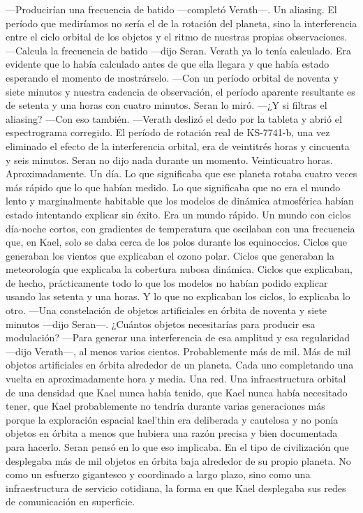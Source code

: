 \documentclass[11pt,a5paper,twoside]{book}
\begin{document}
—Producirían una frecuencia de batido —completó Verath—. Un aliasing. El período que mediríamos no sería el de la rotación del planeta, sino la interferencia entre el ciclo orbital de los objetos y el ritmo de nuestras propias observaciones.
—Calcula la frecuencia de batido —dijo Seran.
Verath ya lo tenía calculado. Era evidente que lo había calculado antes de que ella llegara y que había estado esperando el momento de mostrárselo.
—Con un período orbital de noventa y siete minutos y nuestra cadencia de observación, el período aparente resultante es de setenta y una horas con cuatro minutos.
Seran lo miró.
—¿Y si filtras el aliasing?
—Con eso también. —Verath deslizó el dedo por la tableta y abrió el espectrograma corregido.
El período de rotación real de KS-7741-b, una vez eliminado el efecto de la interferencia orbital, era de veintitrés horas y cincuenta y seis minutos.
Seran no dijo nada durante un momento.
Veinticuatro horas. Aproximadamente. Un día.
Lo que significaba que ese planeta rotaba cuatro veces más rápido que lo que habían medido. Lo que significaba que no era el mundo lento y marginalmente habitable que los modelos de dinámica atmosférica habían estado intentando explicar sin éxito. Era un mundo rápido. Un mundo con ciclos día-noche cortos, con gradientes de temperatura que oscilaban con una frecuencia que, en Kael, solo se daba cerca de los polos durante los equinoccios. Ciclos que generaban los vientos que explicaban el ozono polar. Ciclos que generaban la meteorología que explicaba la cobertura nubosa dinámica. Ciclos que explicaban, de hecho, prácticamente todo lo que los modelos no habían podido explicar usando las setenta y una horas.
Y lo que no explicaban los ciclos, lo explicaba lo otro.
—Una constelación de objetos artificiales en órbita de noventa y siete minutos —dijo Seran—. ¿Cuántos objetos necesitarías para producir esa modulación?
—Para generar una interferencia de esa amplitud y esa regularidad —dijo Verath—, al menos varios cientos. Probablemente más de mil.
Más de mil objetos artificiales en órbita alrededor de un planeta. Cada uno completando una vuelta en aproximadamente hora y media. Una red. Una infraestructura orbital de una densidad que Kael nunca había tenido, que Kael nunca había necesitado tener, que Kael probablemente no tendría durante varias generaciones más porque la exploración espacial kael'thin era deliberada y cautelosa y no ponía objetos en órbita a menos que hubiera una razón precisa y bien documentada para hacerlo.
Seran pensó en lo que eso implicaba. En el tipo de civilización que desplegaba más de mil objetos en órbita baja alrededor de su propio planeta. No como un esfuerzo gigantesco y coordinado a largo plazo, sino como una infraestructura de servicio cotidiana, la forma en que Kael desplegaba sus redes de comunicación en superficie.
\end{document}

